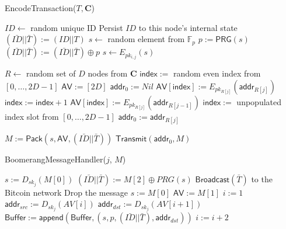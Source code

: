 \begin{algorithm}[t!]
\caption{{\sf EncodeTransaction}($T, \mathbf{C}$)}
\label{alg:encode}
\begin{algorithmic}[1]

	\State $ID \gets $ random unique ID
	\State Persist $ID$ to this node's internal state
	\State $(\bar{ID} || \bar{T}) := (ID || T)$
	\State $s \gets $ random element from $\mathbb{F}_p$
		\State $p := \mathsf{PRG}(s)$
		\State $(\bar{ID} || \bar{T}) := (\bar{ID} || \bar{T}) \oplus p$
		\State $s \gets E_{pk_{i,j}}(s)$
	\EndFor

	\State $R \gets$ random set of $D$ nodes from $\mathbf{C}$
	\State $\mathsf{index} :=$ random even index from $[0,\dots,2D - 1]$ %
	\State $\mathsf{AV} := [2D]$ %
	\State $\mathsf{addr}_0 := Nil$
		\State $\mathsf{AV}[\mathsf{index}] := E_{pk_{R[j]}}(\mathsf{addr}_{R[j]})$
		\State $\mathsf{index} := \mathsf{index} + 1$
		\State $\mathsf{AV}[\mathsf{index}] := E_{pk_{R[j]}}(\mathsf{addr}_{R[j-1]})$
		\State $\mathsf{index} :=$ unpopulated index slot from $[0,\dots,2D-1]$
		\State $\mathsf{addr}_0 := \mathsf{addr}_{R[j]}$
	\EndFor

	\State $M := \mathsf{Pack}(s, \mathsf{AV}, (\bar{ID} || \bar{T}))$
	\State $\mathsf{\mathsf{Transmit}}(\mathsf{addr}_0, M)$
\EndFor

\end{algorithmic}
\end{algorithm}

\begin{algorithm}[t!]
\caption{{\sf BoomerangMessageHandler}($j$, $M$)}
\label{alg:handler}
\begin{algorithmic}[1]

\State $s := D_{sk_{j}}(M[0])$
\State $(\bar{ID} || \bar{T}) := M[2] \oplus PRG(s)$
	\State $\mathsf{Broadcast}(\bar{T})$ to the Bitcoin network
	\State Drop the message
\Else
	\State $s := M[0]$
	\State $\mathsf{AV} := M[1]$
	\State $i := 1$
		\State $\mathsf{addr}_{src} := D_{sk_j}(AV[i])$
			\State $\mathsf{addr}_{dst} := D_{sk_j}(AV[i + 1])$
			\State $\mathsf{Buffer} := \mathsf{append}(\mathsf{Buffer}, (s, p, (\bar{ID} || \bar{T}), \mathsf{addr}_{dst}))$
		\Else
			\State $i := i + 2$
		\EndIf
	\EndWhile
\EndIf

\end{algorithmic}
\end{algorithm}

